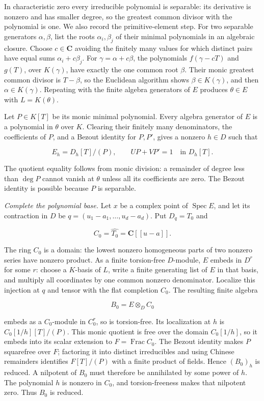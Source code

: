 \documentclass[11pt]{article}
\begin{document}
In characteristic zero every irreducible polynomial is separable: its
derivative is nonzero and has smaller degree, so the greatest common
divisor with the polynomial is one. We also record the primitive-element
step. For two separable generators \(\alpha,\beta\), list the roots
\(\alpha_i,\beta_j\) of their minimal polynomials in an algebraic
closure. Choose \(c\in\mathbf C\) avoiding the finitely many values for
which distinct pairs have equal sums \(\alpha_i+c\beta_j\). For
\(\gamma=\alpha+c\beta\), the polynomials \(f(\gamma-cT)\) and \(g(T)\),
over \(K(\gamma)\), have exactly the one common root \(\beta\). Their
monic greatest common divisor is \(T-\beta\), so the Euclidean algorithm
shows \(\beta\in K(\gamma)\), and then \(\alpha\in K(\gamma)\).
Repeating with the finite algebra generators of \(E\) produces
\(\theta\in E\) with \(L=K(\theta)\).

Let \(P\in K[T]\) be its monic minimal polynomial. Every algebra
generator of \(E\) is a polynomial in \(\theta\) over \(K\). Clearing
their finitely many denominators, the coefficients of \(P\), and a
Bezout identity for \(P,P'\), gives a nonzero \(h\in D\) such that

\[
E_h=D_h[T]/(P),\qquad
U P+V P'=1\quad\text{in }D_h[T].
\]

The quotient equality follows from monic division: a remainder of degree
less than \(\deg P\) cannot vanish at \(\theta\) unless all its
coefficients are zero. The Bezout identity is possible because \(P\) is
separable.

\emph{Complete the polynomial base.} Let \(x\) be a complex point of
\(\operatorname{Spec}E\), and let its contraction in \(D\) be
\(q=(u_1-a_1,\ldots,u_d-a_d)\). Put \(D_q=T_0\) and

\[
C_0=\widehat{T_0}=\mathbf C[[u-a]].
\]

The ring \(C_0\) is a domain: the lowest nonzero homogeneous parts of
two nonzero series have nonzero product. As a finite torsion-free
\(D\)-module, \(E\) embeds in \(D^r\) for some \(r\): choose a
\(K\)-basis of \(L\), write a finite generating list of \(E\) in that
basis, and multiply all coordinates by one common nonzero denominator.
Localize this injection at \(q\) and tensor with the flat completion
\(C_0\). The resulting finite algebra

\[
B_0=E\otimes_D C_0
\]

embeds as a \(C_0\)-module in \(C_0^r\), so is torsion-free. Its
localization at \(h\) is \(C_0[1/h][T]/(P)\). This monic quotient is
free over the domain \(C_0[1/h]\), so it embeds into its scalar
extension to \(F=\operatorname{Frac}C_0\). The Bezout identity makes
\(P\) squarefree over \(F\); factoring it into distinct irreducibles and
using Chinese remainders identifies \(F[T]/(P)\) with a finite product
of fields. Hence \((B_0)_h\) is reduced. A nilpotent of \(B_0\) must
therefore be annihilated by some power of \(h\). The polynomial \(h\) is
nonzero in \(C_0\), and torsion-freeness makes that nilpotent zero. Thus
\(B_0\) is reduced.
\end{document}
